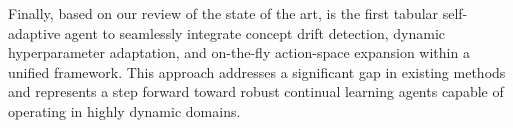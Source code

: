 Finally, based on our review of the state of the art, \adaptiverl is the first tabular self-adaptive agent to seamlessly integrate concept drift detection, dynamic hyperparameter adaptation, and on-the-fly action-space expansion within a unified framework. This approach addresses a significant gap in existing methods and represents a step forward toward robust continual learning agents capable of operating in highly dynamic domains.

\endinput


